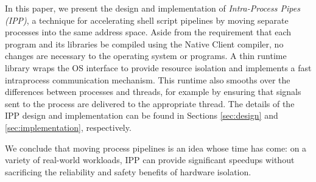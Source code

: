 In this paper, we present the design and implementation of
\emph{Intra-Process Pipes (IPP)}, a technique for accelerating shell
script pipelines by moving separate processes into the same address
space. Aside from the requirement that each program and its libraries be
compiled using the Native Client compiler, no changes are necessary to
the operating system or programs. A thin runtime library wraps the
OS interface to provide resource isolation and implements a fast
intraprocess communication mechanism. This runtime also smooths over the
differences between processes and threads, for example by ensuring that
signals sent to the process are delivered to the appropriate thread. The
details of the IPP design and implementation can be found in Sections
\ref{sec:design} and \ref{sec:implementation}, respectively.


We conclude that moving process pipelines is an idea whose time has
come: on a variety of real-world workloads, IPP can provide significant
speedups without sacrificing the reliability and safety benefits of
hardware isolation.
